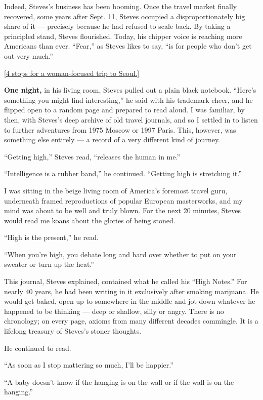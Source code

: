 Indeed, Steves's business has been booming. Once the travel market
finally recovered, some years after Sept. 11, Steves occupied a
disproportionately big share of it --- precisely because he had refused
to scale back. By taking a principled stand, Steves flourished. Today,
his chipper voice is reaching more Americans than ever. ``Fear,'' as
Steves likes to say, ``is for people who don't get out very much.''

\href{https://www.nytimes3xbfgragh.onion/2019/03/13/travel/women-activism-seoul-korea.html}{{[}4
stops for a woman-focused trip to Seoul.{]}}

\textbf{One night,} in his living room, Steves pulled out a plain black
notebook. ``Here's something you might find interesting,'' he said with
his trademark cheer, and he flipped open to a random page and prepared
to read aloud. I was familiar, by then, with Steves's deep archive of
old travel journals, and so I settled in to listen to further adventures
from 1975 Moscow or 1997 Paris. This, however, was something else
entirely --- a record of a very different kind of journey.

``Getting high,'' Steves read, ``releases the human in me.''

``Intelligence is a rubber band,'' he continued. ``Getting high is
stretching it.''

I was sitting in the beige living room of America's foremost travel
guru, underneath framed reproductions of popular European masterworks,
and my mind was about to be well and truly blown. For the next 20
minutes, Steves would read me koans about the glories of being stoned.

``High is the present,'' he read.

``When you're high, you debate long and hard over whether to put on your
sweater or turn up the heat.''

This journal, Steves explained, contained what he called his ``High
Notes.'' For nearly 40 years, he had been writing in it exclusively
after smoking marijuana. He would get baked, open up to somewhere in the
middle and jot down whatever he happened to be thinking --- deep or
shallow, silly or angry. There is no chronology; on every page, axioms
from many different decades commingle. It is a lifelong treasury of
Steves's stoner thoughts.

He continued to read.

``As soon as I stop mattering so much, I'll be happier.''

``A baby doesn't know if the hanging is on the wall or if the wall is on
the hanging.''

